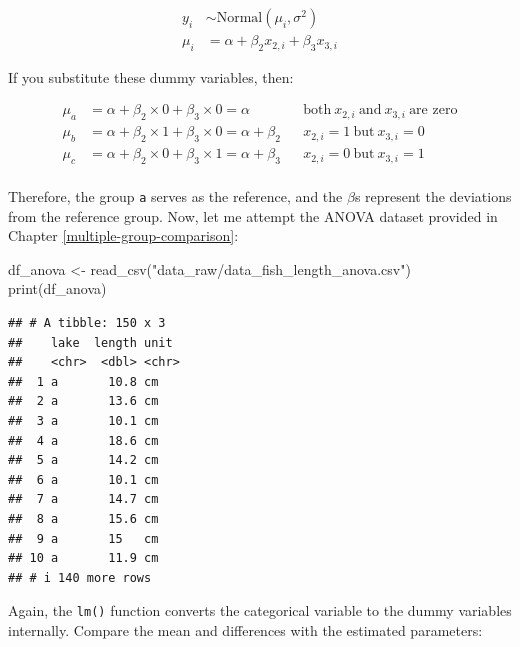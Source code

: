 \documentclass[
]{article}
\newenvironment{Shaded}{\begin{snugshade}}{\end{snugshade}}
\newcommand{\FunctionTok}[1]{\textcolor[rgb]{0.00,0.00,0.00}{#1}}
\newcommand{\NormalTok}[1]{#1}
\newcommand{\OtherTok}[1]{\textcolor[rgb]{0.56,0.35,0.01}{#1}}
\newcommand{\StringTok}[1]{\textcolor[rgb]{0.31,0.60,0.02}{#1}}
\begin{document}
\[
\begin{aligned}
y_i &\sim \text{Normal}(\mu_i, \sigma^2)\\
\mu_i &= \alpha + \beta_{2} x_{2,i}  + \beta_{3} x_{3,i}
\end{aligned}
\]

If you substitute these dummy variables, then:

\[
\begin{aligned}
\mu_a &= \alpha + \beta_2 \times 0 + \beta_3 \times 0 = \alpha &&\text{both}~x_{2,i}~\text{and}~x_{3,i}~\text{are zero}\\
\mu_b &= \alpha + \beta_2 \times 1 + \beta_3 \times 0 = \alpha + \beta_2 &&x_{2,i} = 1~\text{but}~x_{3,i}=0\\
\mu_c &= \alpha + \beta_2 \times 0 + \beta_3 \times 1 = \alpha + \beta_3 &&x_{2,i} = 0~\text{but}~x_{3,i}=1\\
\end{aligned}
\]

Therefore, the group \texttt{a} serves as the reference, and the \(\beta\)s represent the deviations from the reference group. Now, let me attempt the ANOVA dataset provided in Chapter \ref{multiple-group-comparison}:

\begin{Shaded}
\begin{Highlighting}[]
\NormalTok{df\_anova }\OtherTok{\textless{}{-}} \FunctionTok{read\_csv}\NormalTok{(}\StringTok{"data\_raw/data\_fish\_length\_anova.csv"}\NormalTok{)}
\FunctionTok{print}\NormalTok{(df\_anova)}
\end{Highlighting}
\end{Shaded}

\begin{verbatim}
## # A tibble: 150 x 3
##    lake  length unit 
##    <chr>  <dbl> <chr>
##  1 a       10.8 cm   
##  2 a       13.6 cm   
##  3 a       10.1 cm   
##  4 a       18.6 cm   
##  5 a       14.2 cm   
##  6 a       10.1 cm   
##  7 a       14.7 cm   
##  8 a       15.6 cm   
##  9 a       15   cm   
## 10 a       11.9 cm   
## # i 140 more rows
\end{verbatim}

Again, the \texttt{lm()} function converts the categorical variable to the dummy variables internally. Compare the mean and differences with the estimated parameters:
\end{document}
